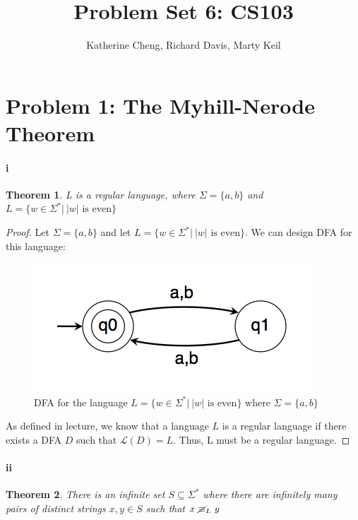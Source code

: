 \documentclass[10pt,letter]{article}
\newtheorem*{thm}{Theorem}
\begin{document}

\title{Problem Set 6: CS103}

\author{Katherine Cheng, Richard Davis, Marty Keil}

 
\maketitle

\section*{Problem 1: The Myhill-Nerode Theorem}
\paragraph{i}
\begin{thm} L is a regular language, where $\Sigma = \{a,b\}$ and $L=\{w \in \Sigma^* |\ |w| \text{ is even}\}$\end{thm}
\begin{proof}

Let $\Sigma = \{a,b\}$ and let $L=\{w \in \Sigma^* |\ |w| \text{ is even}\}$. We can design DFA for this language:

\begin{figure}[h]
    \centering
    \includegraphics[width=0.4\linewidth]{hw6_1i.png}
    \caption{DFA for the language $L=\{w \in \Sigma^* |\ |w| \text{ is even}\}$ where $\Sigma = \{a,b\}$}
    \label{fig:q1i}
\end{figure}

As defined in lecture, we know that a language $L$ is a regular language if there exists a DFA $D$ such that $\mathscr{L}(D) =L$. Thus, L must be a regular language.
\end{proof}

\paragraph{ii}
\begin{thm} There is an infinite set $S \subseteq \Sigma^*$ where there are infinitely many pairs of distinct strings $x, y \in S$ such that $x\ \cancel{\equiv}_L\ y$ \end{thm}
\end{document}
